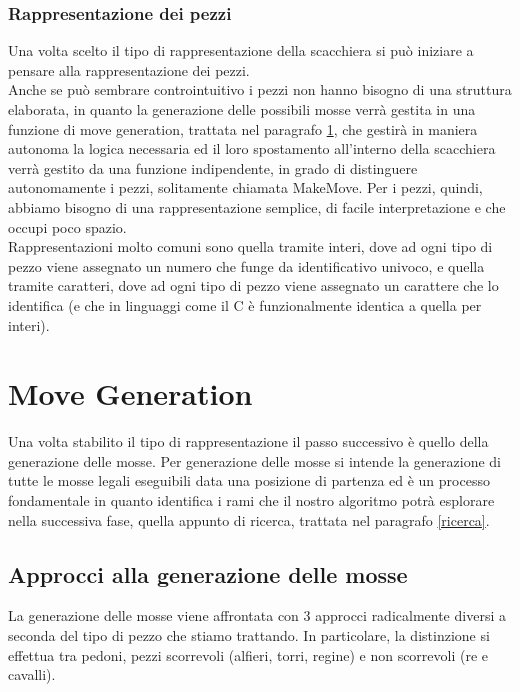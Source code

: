 \subsubsection{Rappresentazione dei pezzi}
Una volta scelto il tipo di rappresentazione della scacchiera si può iniziare a pensare alla rappresentazione dei pezzi.
\\Anche se può sembrare controintuitivo i pezzi non hanno bisogno di una struttura elaborata, in quanto la generazione delle possibili
mosse verrà gestita in una funzione di move generation, trattata nel paragrafo \ref{move generation}, che gestirà in maniera autonoma la logica necessaria ed il loro spostamento all'interno della scacchiera verrà gestito da una funzione indipendente, in grado di distinguere autonomamente i pezzi, solitamente chiamata
MakeMove. Per i pezzi, quindi, abbiamo bisogno di una
rappresentazione semplice, di facile interpretazione e che occupi poco spazio.\\Rappresentazioni molto comuni sono quella
tramite interi, dove ad ogni tipo di pezzo viene assegnato un numero che funge da identificativo univoco, e quella tramite
caratteri, dove ad ogni tipo di pezzo viene assegnato un carattere che lo identifica (e che in linguaggi come il C è funzionalmente identica a quella per interi).


\section{Move Generation}
\label{move generation} %
%
Una volta stabilito il tipo di rappresentazione il passo successivo è quello della generazione delle mosse. Per generazione delle mosse si intende la generazione
di tutte le mosse legali eseguibili data una posizione di partenza ed è un processo fondamentale in quanto identifica i rami che
il nostro algoritmo potrà esplorare nella successiva fase, quella appunto di ricerca, trattata nel paragrafo \ref{ricerca}.



\subsection{Approcci alla generazione delle mosse}
La generazione delle mosse viene affrontata con 3 approcci radicalmente diversi a seconda del tipo di pezzo che stiamo trattando. In particolare, la distinzione si effettua tra 
pedoni, pezzi scorrevoli (alfieri, torri, regine) e non scorrevoli (re e cavalli).

